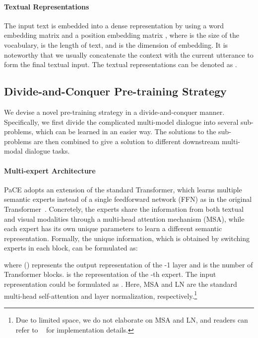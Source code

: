 \documentclass[11pt]{article}
\begin{document}
\paragraph{Textual Representations}
The input text  is embedded into a dense representation  by using a word embedding matrix  and a position embedding matrix , where  is the size of the vocabulary,  is the length of text, and  is the dimension of embedding. It is noteworthy that we usually concatenate the context with the current utterance to form the final textual input. The textual representations can be denoted as .

\subsection{Divide-and-Conquer Pre-training Strategy}
We devise a novel pre-training strategy  in a divide-and-conquer manner. 
Specifically, we first divide the complicated multi-model dialogue into several sub-problems, which can be learned in an easier way. The solutions to the sub-problems are then combined to give a solution to different downstream multi-modal dialogue tasks. 


\paragraph{Multi-expert Architecture}
PaCE adopts an extension of the standard Transformer, which learns multiple semantic experts instead of a single feedforward network (FFN) as in the original Transformer~\citep{bao2021vlmo}. Concretely, the experts share the information from both textual and visual modalities through a multi-head attention mechanism (MSA), while each expert  has its own unique parameters to learn a different semantic representation.
Formally, the unique information, which is obtained by switching experts in each block, can be formulated as:

where  () represents the output representation of the -1 layer and  is the number of Transformer blocks.
 is the representation of the -th expert. The input representation could be formulated as
.
Here, MSA and LN are the standard multi-head self-attention and layer normalization, respectively.\footnote{Due to limited space, we do not elaborate on MSA and LN, and readers can refer to ~\cite{vaswani2017attention} for implementation details.} 
\end{document}
